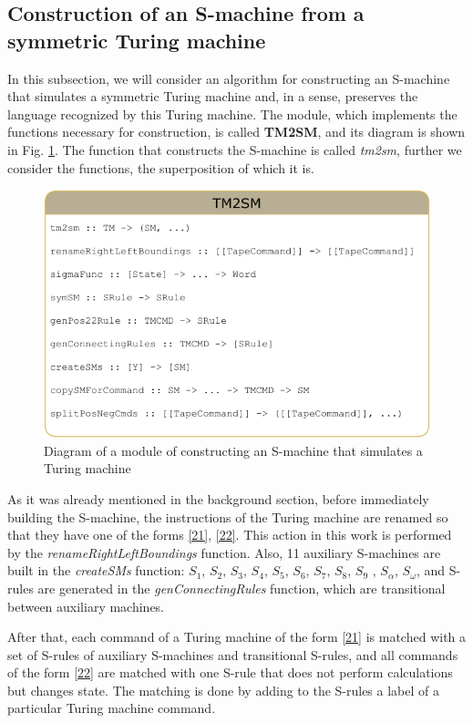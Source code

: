 \documentclass[conference]{IEEEtran}
\theoremstyle{definition}
\begin{document}
\subsection{Construction of an S-machine from a symmetric Turing machine}

In this subsection, we will consider an algorithm for constructing an S-machine that simulates a symmetric Turing machine and, in a sense, preserves the language recognized by this Turing machine. The module, which implements the functions necessary for construction, is called \textbf{TM2SM}, and its diagram is shown in Fig. \ref{fig:TM2SM}. The function that constructs the S-machine is called \textit{tm2sm}, further we consider the functions, the superposition of which it is.

\begin{figure}[H]
\centering
  \includegraphics[width=\linewidth]{pics/TM2SM(2).pdf}
  \caption{Diagram of a module of constructing an S-machine that simulates a Turing machine}
  \label{fig:TM2SM}
\end{figure}

As it was already mentioned in the background section, before immediately building the S-machine, the instructions of the Turing machine are renamed so that they have one of the forms \eqref{21}, \eqref{22}. This action in this work is performed by the \textit{renameRightLeftBoundings} function. Also, 11 auxiliary S-machines are built in the \textit{createSMs} function: $ S_1 $, $ S_2 $, $ S_3 $, $ S_4 $, $ S_5 $, $ S_6 $, $ S_7 $, $ S_8 $, $ S_9 $ , $ S_{\alpha} $, $ S_{\omega} $, and S-rules are generated in the \textit{genConnectingRules} function, which are transitional between auxiliary machines.

After that, each command of a Turing machine of the form \eqref{21} is matched with a set of S-rules of auxiliary S-machines and transitional S-rules, and all commands of the form \eqref{22} are matched with one S-rule that does not perform calculations but changes state. The matching is done by adding to the S-rules a label of a particular Turing machine command.
\end{document}
